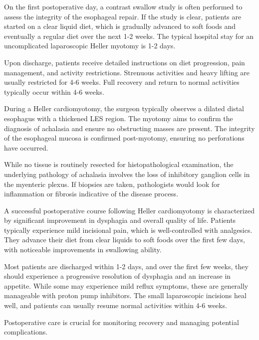 On the first postoperative day, a contrast swallow study is often performed to assess the integrity of the esophageal repair. If the study is clear, patients are started on a clear liquid diet, which is gradually advanced to soft foods and eventually a regular diet over the next 1-2 weeks. The typical hospital stay for an uncomplicated laparoscopic Heller myotomy is 1-2 days. 

Upon discharge, patients receive detailed instructions on diet progression, pain management, and activity restrictions. Strenuous activities and heavy lifting are usually restricted for 4-6 weeks. Full recovery and return to normal activities typically occur within 4-6 weeks.

During a Heller cardiomyotomy, the surgeon typically observes a dilated distal esophagus with a thickened LES region. The myotomy aims to confirm the diagnosis of achalasia and ensure no obstructing masses are present. The integrity of the esophageal mucosa is confirmed post-myotomy, ensuring no perforations have occurred. 

While no tissue is routinely resected for histopathological examination, the underlying pathology of achalasia involves the loss of inhibitory ganglion cells in the myenteric plexus. If biopsies are taken, pathologists would look for inflammation or fibrosis indicative of the disease process.

A successful postoperative course following Heller cardiomyotomy is characterized by significant improvement in dysphagia and overall quality of life. Patients typically experience mild incisional pain, which is well-controlled with analgesics. They advance their diet from clear liquids to soft foods over the first few days, with noticeable improvements in swallowing ability.

Most patients are discharged within 1-2 days, and over the first few weeks, they should experience a progressive resolution of dysphagia and an increase in appetite. While some may experience mild reflux symptoms, these are generally manageable with proton pump inhibitors. The small laparoscopic incisions heal well, and patients can usually resume normal activities within 4-6 weeks.

Postoperative care is crucial for monitoring recovery and managing potential complications. 

